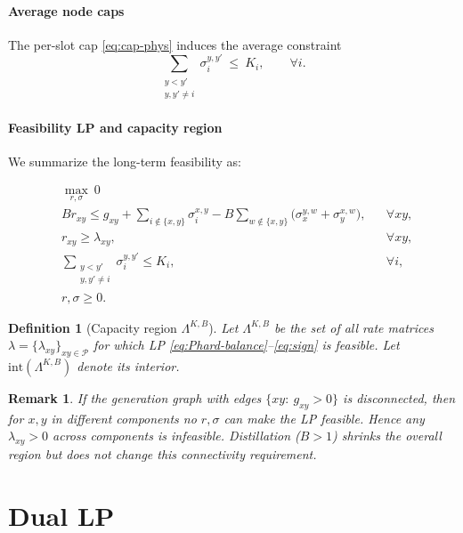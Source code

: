 \documentclass[11pt]{article}
\newtheorem{definition}{Definition}
\newtheorem{remark}{Remark}
\newcommand{\Pairs}{\mathcal{P}} %
\begin{document}
\paragraph{Average node caps}

The per-slot cap \eqref{eq:cap-phys} induces the average constraint
\begin{equation}
\sum_{\substack{y<y'\\ y,y'\neq i}}\sigma_i^{y,y'}
\ \le\ K_i,
\qquad \forall i.
\label{eq:avg-cap}
\end{equation}

\paragraph{Feasibility LP and capacity region}

We summarize the long-term feasibility as:

\begin{align}
&\max_{r,\sigma}  \ 0 && \\
& B r_{xy} \le g_{xy}
+\sum_{i\notin\{x,y\}}\sigma_i^{x,y}
- B\sum_{w\notin\{x,y\}}\big(\sigma_x^{y,w}+\sigma_y^{x,w}\big),
&& \forall xy,
\label{eq:Phard-balance}\\
&r_{xy} \ge \lambda_{xy}, && \forall xy,
\label{eq:Phard-demand}\\
&\sum_{\substack{y<y'\\ y,y'\neq i}}\sigma_i^{y,y'} \le K_i,
&& \forall i,
\label{eq:Phard-cap}\\
&r,\sigma \ge 0. \label{eq:sign}
\end{align}

\begin{definition}[Capacity region $\Lambda^{K,B}$]
Let $\Lambda^{K,B}$ be the set of all rate matrices $\lambda=\{\lambda_{xy}\}_{xy\in\Pairs}$ for which {\rm LP} \eqref{eq:Phard-balance}--\eqref{eq:sign} is feasible. Let $\mathrm{int}(\Lambda^{K,B})$ denote its interior.
\end{definition}
\begin{remark}
If the generation graph with edges $\{xy:\ g_{xy}>0\}$ is disconnected, then for $x,y$ in different components no $r, \sigma$ can make the LP feasible. Hence any $\lambda_{xy}>0$ across components is infeasible. Distillation ($B>1$) shrinks the overall region but does not change this connectivity requirement.
\end{remark}

\section{Dual LP}
\end{document}
